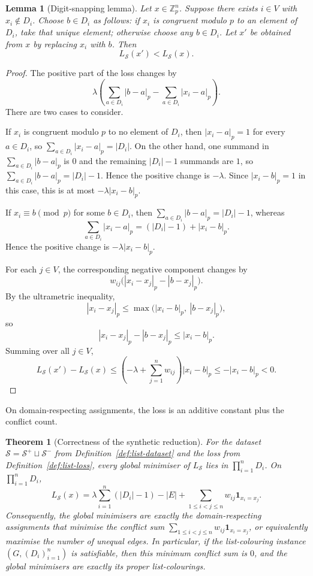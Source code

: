 \documentclass[11pt]{article}
\newtheorem{theorem}{Theorem}
\newtheorem{lemma}{Lemma}
\begin{document}
\begin{lemma}[Digit-snapping lemma]
\label{lem:digit-snapping}
Let \(x\in\mathbb Z_p^n\). Suppose there exists \(i\in V\) with \(x_i\notin D_i\). Choose \(b\in D_i\) as follows: if \(x_i\) is congruent modulo \(p\) to an element of \(D_i\), take that unique element; otherwise choose any \(b\in D_i\). Let \(x'\) be obtained from \(x\) by replacing \(x_i\) with \(b\). Then
\[
L_{\mathcal S}(x')<L_{\mathcal S}(x).
\]
\end{lemma}

\begin{proof}
The positive part of the loss changes by
\[
\lambda\left(\sum_{a\in D_i}|b-a|_p-\sum_{a\in D_i}|x_i-a|_p\right).
\]
There are two cases to consider.

If \(x_i\) is congruent modulo \(p\) to no element of \(D_i\), then \(|x_i-a|_p=1\) for every \(a\in D_i\), so \(\sum_{a\in D_i}|x_i-a|_p=|D_i|\). On the other hand, one summand in \(\sum_{a\in D_i}|b-a|_p\) is \(0\) and the remaining \(|D_i|-1\) summands are \(1\), so \(\sum_{a\in D_i}|b-a|_p=|D_i|-1\). Hence the positive change is \(-\lambda\). Since \(|x_i-b|_p=1\) in this case, this is at most \(-\lambda |x_i-b|_p\).

If \(x_i\equiv b \pmod p\) for some \(b\in D_i\), then \(\sum_{a\in D_i}|b-a|_p=|D_i|-1\), whereas
\[
\sum_{a\in D_i}|x_i-a|_p=(|D_i|-1)+|x_i-b|_p.
\]
Hence the positive change is \(-\lambda |x_i-b|_p\).

For each \(j\in V\), the corresponding negative component changes by
\[
w_{ij}\bigl(|x_i-x_j|_p-|b-x_j|_p\bigr).
\]
By the ultrametric inequality,
\[
|x_i-x_j|_p \le \max\bigl(|x_i-b|_p,\ |b-x_j|_p\bigr),
\]
so
\[
|x_i-x_j|_p-|b-x_j|_p \le |x_i-b|_p.
\]
Summing over all \(j\in V\),
\[
L_{\mathcal S}(x')-L_{\mathcal S}(x)
\le
\left(-\lambda+\sum_{j=1}^n w_{ij}\right)|x_i-b|_p
\le
-|x_i-b|_p
<
0.
\]
\end{proof}

On domain-respecting assignments, the loss is an additive constant plus the conflict count.

\begin{theorem}[Correctness of the synthetic reduction]
\label{thm:all-different}
For the dataset \(\mathcal S=\mathcal S^+\sqcup\mathcal S^-\) from Definition~\ref{def:list-dataset} and the loss from Definition~\ref{def:list-loss}, every global minimiser of \(L_{\mathcal S}\) lies in \(\prod_{i=1}^n D_i\). On \(\prod_{i=1}^n D_i\),
\[
L_{\mathcal S}(x)
=
\lambda\sum_{i=1}^n (|D_i|-1)
-|E|
+\sum_{1\le i<j\le n} w_{ij}\mathbf 1_{x_i=x_j}.
\]
Consequently, the global minimisers are exactly the domain-respecting assignments that minimise the conflict sum \(\sum_{1\le i<j\le n} w_{ij}\mathbf 1_{x_i=x_j}\), or equivalently maximise the number of unequal edges. In particular, if the list-colouring instance \((G,(D_i)_{i=1}^n)\) is satisfiable, then this minimum conflict sum is \(0\), and the global minimisers are exactly its proper list-colourings.
\end{theorem}
\end{document}
